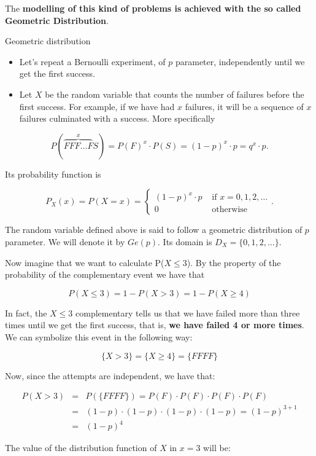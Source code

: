 \documentclass[
]{book}
\providecommand{\tightlist}{%
  \setlength{\itemsep}{0pt}\setlength{\parskip}{0pt}}
\theoremstyle{definition}
\theoremstyle{definition}
\theoremstyle{definition}
\theoremstyle{definition}
\theoremstyle{remark}
\begin{document}
The \textbf{modelling of this kind of problems is achieved with the so called Geometric Distribution}.

Geometric distribution

\begin{itemize}
\tightlist
\item
  Let's repeat a Bernoulli experiment, of \(p\) parameter, independently until we get the first success.
\item
  Let \(X\) be the random variable that counts the number of failures before the first success. For example, if we have had \(x\) failures, it will be a sequence of \(x\) failures culminated with a success. More specifically
\end{itemize}

\[
P(\overbrace{FFF\ldots F}^{x}S)=P(F)^{x}\cdot P(S)=(1-p)^{x}\cdot p=q^{x}\cdot p.
\]

Its probability function is

\[
P_X(x)=P(X=x)=\left\{\begin{array}{ll}
(1-p)^{x}\cdot p & \mbox{ if } x=0,1,2,\ldots\\
0 &\mbox{ otherwise}
\end{array}\right..
\]

The random variable defined above is said to follow a geometric distribution of \(p\) parameter. We will denote it by \(Ge(p)\). Its domain is \(D_X=\{0,1,2,\ldots\}\).

Now imagine that we want to calculate P(\(X\leq 3\)). By the property of the probability of the complementary event we have that

\[
P(X\leq 3 )=1-P(X> 3)=1-P(X\geq 4)
\]

In fact, the \(X\leq 3\) complementary tells us that we have failed more than three times until we get the first success, that is, \textbf{we have failed 4 or more times}. We can symbolize this event in the following way:

\[
\{X>3\}=\{X\geq 4\}= \{FFFF\}
\]

Now, since the attempts are independent, we have that:

\begin{align}
P(X>3) & = & P(\{FFFF\})= P(F)\cdot P(F)\cdot P(F)\cdot P(F)\\
&=& (1-p)\cdot (1-p)\cdot (1-p)\cdot (1-p)= (1-p)^{3+1}\\
&=&(1-p)^{4}
\end{align}

The value of the distribution function of \(X\) in \(x=3\) will be:
\end{document}
